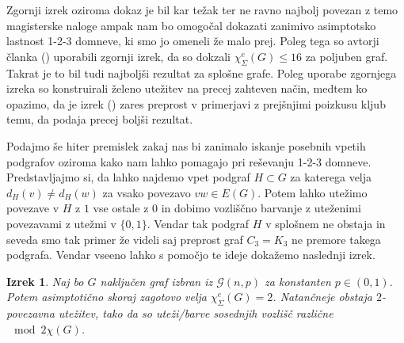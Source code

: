 \documentclass[12pt,a4paper,twoside]{article}
\theoremstyle{definition} %
\theoremstyle{plain} %
\newtheorem{izrek}[definicija]{Izrek}
\newcommand{\ec}{\chi_{\Sigma}^e}
\numberwithin{equation}{section}  %
\begin{document}
Zgornji izrek oziroma dokaz je bil kar težak ter ne ravno najbolj povezan z temo magisterske naloge ampak nam bo omogočal dokazati zanimivo asimptotsko lastnost 1-2-3 domneve, ki smo jo omeneli že malo prej. Poleg tega so avtorji članka () uporabili zgornji izrek, da so dokzali $\ec(G) \le 16$ za poljuben graf. Takrat je to bil tudi najboljši rezultat za splošne grafe. Poleg uporabe zgornjega izreka so konstruirali želeno utežitev na precej zahteven način, medtem ko opazimo, da je izrek () zares preprost v primerjavi z prejšnjimi poizkusu kljub temu, da podaja precej boljši rezultat.

Podajmo še hiter premislek zakaj nas bi zanimalo iskanje posebnih vpetih podgrafov oziroma kako nam lahko pomagajo pri reševanju 1-2-3 domneve. Predstavljajmo si, da lahko najdemo vpet podgraf $H \subset G$ za katerega velja $d_H(v) \neq d_H(w)$ za vsako povezavo $vw \in E(G)$. Potem lahko utežimo povezave v $H$ z $1$ vse ostale z $0$ in dobimo vozliščno barvanje z uteženimi povezavami z utežmi v $\{0,1\}$. Vendar tak podgraf $H$ v splošnem ne obstaja in seveda smo tak primer že videli saj preprost graf $C_3 = K_3$ ne premore takega podgrafa. Vendar vseeno lahko s pomočjo te ideje dokažemo naslednji izrek.

\begin{izrek}
Naj bo $G$ naključen graf izbran iz $\mathcal{G}(n,p)$ za konstanten $p \in (0,1)$. Potem asimptotično skoraj zagotovo velja $\ec(G) = 2$. Natančneje obstaja $2$-povezavna utežitev, tako da so uteži/barve sosednjih vozlišč različne $\mod 2 \chi(G)$.
\end{izrek}
\end{document}
